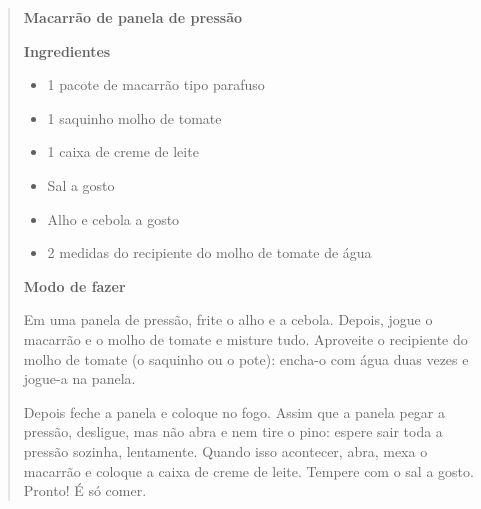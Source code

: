 \begin{quote}
\textbf{Macarrão de panela de pressão}

\textbf{Ingredientes}


\begin{itemize}
\item 1 pacote de macarrão tipo parafuso

\item 1 saquinho molho de tomate

\item 1 caixa de creme de leite

\item Sal a gosto

\item Alho e cebola a gosto

\item 2 medidas do recipiente do molho de tomate de água

\end{itemize}

\textbf{Modo de fazer}

Em uma panela de pressão, frite o alho e a cebola. Depois, jogue o
macarrão e o molho de tomate e misture tudo. Aproveite o recipiente
do molho de tomate (o saquinho ou o pote): encha-o com água duas vezes
e jogue-a na panela.

Depois feche a panela e coloque no fogo. Assim que a panela pegar a
pressão, desligue, mas não abra e nem tire o pino: espere sair toda 
a pressão sozinha, lentamente. Quando isso acontecer, abra, mexa o
macarrão e coloque a caixa de creme de leite. Tempere com o sal a gosto.
Pronto! É só comer. 
\end{quote}


